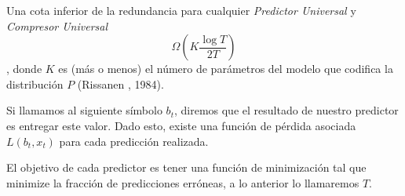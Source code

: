 Una cota inferior de la redundancia para cualquier \emph{Predictor Universal} y \emph{Compresor Universal} \begin{equation}
\Omega( K \dfrac{\log T}{2 T } )
\end{equation}, donde $K$ es (más o menos) el número de parámetros del modelo que codifica la distribución $P$ (Rissanen \cite{Rissanen1984}, 1984).






 

Si llamamos al siguiente símbolo $b_{t}$, diremos que el resultado de nuestro predictor es entregar este valor. Dado esto, existe una función de pérdida asociada $L( b_{t},x_{t} )$ para cada predicción realizada. 

El objetivo de cada predictor es tener una función de minimización tal que minimize la fracción de predicciones erróneas, a lo anterior lo llamaremos $T$.%










